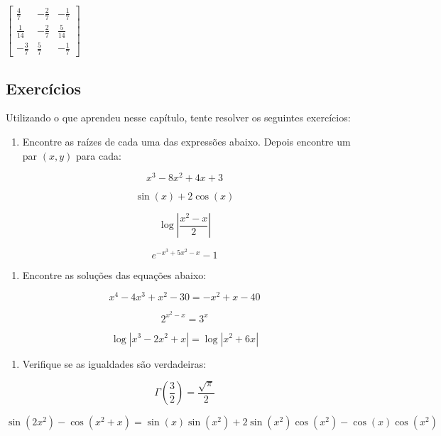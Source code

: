 \documentclass[11pt, brazilian]{article}
\providecommand{\tightlist}{%
      \setlength{\itemsep}{0pt}\setlength{\parskip}{0pt}}
\newcommand{\prompt}[4]{
        \ttfamily\llap{{\color{#2}[#3]:\hspace{3pt}#4}}\vspace{-\baselineskip}
    }
\begin{document}
            
\prompt{Out}{outcolor}{40}{}
    
    $\displaystyle \left[\begin{matrix}\frac{4}{7} & - \frac{2}{7} & - \frac{1}{7}\\\frac{1}{14} & - \frac{2}{7} & \frac{5}{14}\\- \frac{3}{7} & \frac{5}{7} & - \frac{1}{7}\end{matrix}\right]$

    

    \hypertarget{exercuxedcios}{%
\subsection{Exercícios}\label{exercuxedcios}}

Utilizando o que aprendeu nesse capítulo, tente resolver os seguintes
exercícios:

\begin{enumerate}
\def\labelenumi{\arabic{enumi}.}
\tightlist
\item
  Encontre as raízes de cada uma das expressões abaixo. Depois encontre
  um par \((x,y)\) para cada:
\end{enumerate}

\[x^3 - 8x^2 + 4x + 3 \]

\[\sin(x) + 2\cos(x)\]

\[\log\left|\dfrac{x^2 - x}{2}\right|\]

\[e^{-x^3 + 5x^2 -x} -1\]

\begin{enumerate}
\def\labelenumi{\arabic{enumi}.}
\setcounter{enumi}{1}
\tightlist
\item
  Encontre as soluções das equações abaixo:
\end{enumerate}

\[x^4 - 4x^3 + x^2 - 30 = -x^2 + x - 40\]

\[2^{x^2 -x} = 3^x\]

\[\log\left|x^3 - 2x^2 +x\right| = \log\left|x^2 + 6x\right|\]

\begin{enumerate}
\def\labelenumi{\arabic{enumi}.}
\setcounter{enumi}{2}
\tightlist
\item
  Verifique se as igualdades são verdadeiras:
\end{enumerate}

\[\Gamma\left(\dfrac{3}{2}\right) = \dfrac{\sqrt{\pi}}{2}\]

\[\sin(2x^2) - \cos(x^2 +x) = \sin{\left(x \right)} \sin{\left(x^{2} \right)} + 2 \sin{\left(x^{2} \right)} \cos{\left(x^{2} \right)} - \cos{\left(x \right)} \cos{\left(x^{2} \right)}\]
\end{document}

